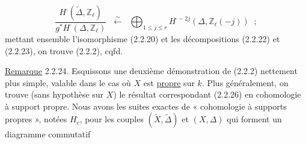 \begin{equation}\tag{2.2.23}
\frac{H^{\cdot}(\widetilde{\Delta},\mathbb{Z}_{\ell})}{g^{*}H^{\cdot}(\Delta,\mathbb{Z}_{\ell})} \;\;\stackrel{\sim}{\longleftarrow}\;\; \bigoplus_{1\leq j\leq r} H^{\cdot-2j}(\Delta,\mathbb{Z}_{\ell}(-j)) \;\;;
\end{equation}
mettant ensemble l'isomorphisme (2.2.20) et les décompositions (2.2.22) et (2.2.23), on trouve (2.2.2), cqfd.

\underline{Remarque} 2.2.24. \quad Esquissons une deuxième démonstration de (2.2.2) nettement plus simple, valable dans le cas où $X$ est \underline{propre} sur $k$. Plus généralement, on trouve (sans hypothèse sur $X$) le résultat correspondant (2.2.26) en cohomologie à support propre. Nous avons les suites exactes de « cohomologie à supports propres », notées $H^{\cdot}_{c}$, pour les couples $(\widetilde{X},\widetilde{\Delta})$ et $(X,\Delta)$ qui forment un diagramme commutatif



